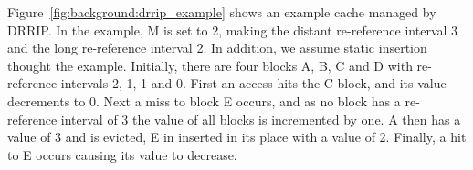 Figure~\ref{fig:background:drrip_example} shows an example cache managed by DRRIP.
In the example, M is set to 2, making the distant re-reference interval 3 and the long re-reference interval 2. 
In addition, we assume static insertion thought the example.
Initially, there are four blocks A, B, C and D with re-reference intervals 2, 1, 1 and 0.
First an access hits the C block, and its value decrements to 0.
Next a miss to block E occurs, and as no block has a re-reference interval of 3 the value of all blocks is incremented by one. 
A then has a value of 3 and is evicted, E in inserted in its place with a value of 2.
Finally, a hit to E occurs causing its value to decrease.

